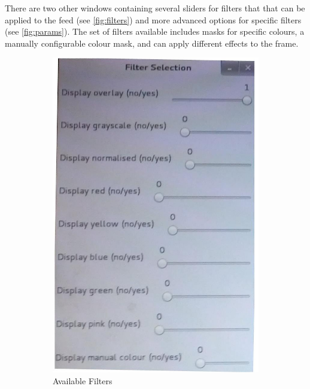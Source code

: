 There are two other windows containing several sliders for filters that that can be applied to the feed (see \autoref{fig:filters}) and more advanced options for specific filters (see \autoref{fig:params}). The set of filters available includes masks for specific colours, a manually configurable colour mask, and can apply different effects to the frame.


\begin{figure}[H]
\centering
\begin{subfigure}{.5\textwidth}
\centering
\includegraphics[scale=0.2]{vision_filters}
\caption{Available Filters}
\label{fig:filters}
\end{subfigure}%
\begin{subfigure}{.5\textwidth}
\centering

\end{subfigure}
\end{figure}
